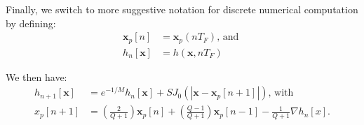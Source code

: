 \documentclass{article}
\newcommand{\x}{\mathbf{x}}
\begin{document}
Finally, we switch to more suggestive notation for discrete numerical computation by defining:
\begin{align}
	\x_p[n] &= \x_p(n T_F) \text{, and }\\
	h_n[\x] &= h(\x,n T_F)
\end{align}

We then have:
\begin{align}
	h_{n+1}[\x] &= e^{-1/M} h_n[\x] + S J_{0}(|\x - \x_p[n+1]|) \text{, with }\\
	x_p[n+1] &= \left( \frac{2}{Q+1} \right) \x_p[n] + \left( \frac{Q-1}{Q+1} \right) \x_p[n-1] - \frac{1}{Q+1} \nabla h_{n}[x].
\end{align}
\end{document}
